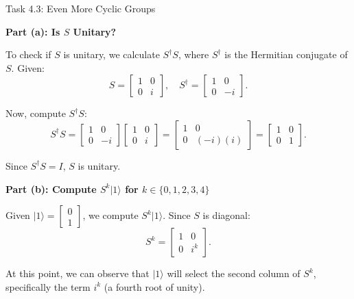 \documentclass[aspectratio=169]{beamer}
\begin{document}
\begin{frame}[fragile]{Task 4.3: Even More Cyclic Groups}

{\footnotesize
\textbf{Part (a): Is \( S \) Unitary?}

To check if \( S \) is unitary, we calculate \( S^\dagger S \), where \( S^\dagger \) is the Hermitian conjugate of \( S \). Given:
\[
S = \begin{bmatrix}
1 & 0 \\
0 & i
\end{bmatrix}, \quad
S^\dagger = \begin{bmatrix}
1 & 0 \\
0 & -i
\end{bmatrix}.
\]

Now, compute \( S^\dagger S \):
\[
S^\dagger S = \begin{bmatrix}
1 & 0 \\
0 & -i
\end{bmatrix}
\begin{bmatrix}
1 & 0 \\
0 & i
\end{bmatrix} = \begin{bmatrix}
1 & 0 \\
0 & (-i)(i)
\end{bmatrix} = \begin{bmatrix}
1 & 0 \\
0 & 1
\end{bmatrix}.
\]

Since \( S^\dagger S = I \), \( S \) is unitary.

\vspace{0.5em}

\textbf{Part (b): Compute \( S^k \lvert 1 \rangle \) for \( k \in \{0, 1, 2, 3, 4\} \)}

Given \( \lvert 1 \rangle = \begin{bmatrix} 0 \\ 1 \end{bmatrix} \), we compute \( S^k \lvert 1 \rangle \). Since \( S \) is diagonal:
\[
S^k = \begin{bmatrix}
1 & 0 \\
0 & i^k
\end{bmatrix}.
\]

At this point, we can observe that \( \lvert 1 \rangle \) will select the second column of \( S^k \), specifically the term \( i^k \) (a fourth root of unity).

}
\end{frame}
\end{document}
